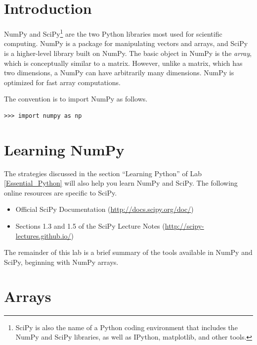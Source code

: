 \label{lab:NumPyArrays}

\section*{Introduction}

NumPy and SciPy\footnote{SciPy is also the name of a Python coding environment that includes the NumPy and SciPy libraries, as well as IPython, matplotlib, and other tools.} are the two Python libraries most used for scientific computing. NumPy is a package for manipulating vectors and arrays, and SciPy is a higher-level library built on NumPy. The basic object in NumPy is the \emph{array}, which is conceptually similar to a matrix. However, unlike a matrix, which has two dimensions, a NumPy  can have arbitrarily many dimensions. NumPy is optimized for fast array computations.

The convention is to import NumPy as follows.

\begin{lstlisting}
>>> import numpy as np
\end{lstlisting}

\section*{Learning NumPy}
The strategies discussed in the section ``Learning Python'' of Lab \ref{Essential_Python} will also help you learn NumPy and SciPy. The following online resources are specific to SciPy.
\begin{itemize}
\item Official SciPy Documentation (\url{http://docs.scipy.org/doc/})
\item Sections 1.3 and 1.5 of the SciPy Lecture Notes (\url{http://scipy-lectures.github.io/})
\end{itemize}
The remainder of this lab is a brief summary of the tools available in NumPy and SciPy, beginning with NumPy arrays.


\section*{Arrays}


